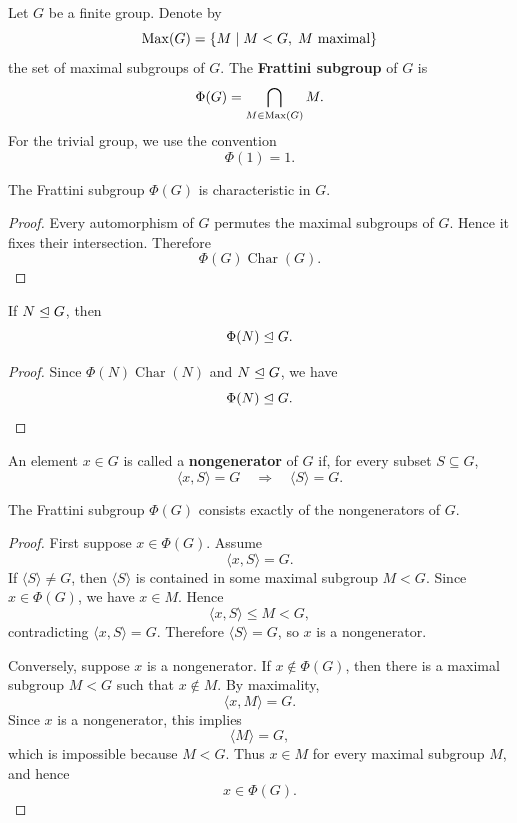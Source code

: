 \begin{definition}
Let \(G\) be a finite group. Denote by
\[
    \operatorname{Max}(G)=\{M\mid M<G,\; M\text{ maximal}\}
\]
the set of maximal subgroups of \(G\). The \textbf{Frattini subgroup} of \(G\) is
\[
    \Phi(G)=\bigcap_{M\in \operatorname{Max}(G)}M.
\]
For the trivial group, we use the convention
\[
    \Phi(1)=1.
\]
\end{definition}

\begin{proposition}
The Frattini subgroup \(\Phi(G)\) is characteristic in \(G\).
\end{proposition}

\begin{proof}
Every automorphism of \(G\) permutes the maximal subgroups of \(G\). Hence it
fixes their intersection. Therefore
\[
    \Phi(G)  \operatorname{Char}(G).
\]
\end{proof}

\begin{corollary}
If \(N\trianglelefteq G\), then
\[
    \Phi(N)\trianglelefteq G.
\]
\end{corollary}

\begin{proof}
Since \(\Phi(N)  \operatorname{Char}(N)\) and \(N\trianglelefteq G\), we have
\[
    \Phi(N)\trianglelefteq G.
\]
\end{proof}

\begin{definition}[Nongenerator]
An element \(x\in G\) is called a \textbf{nongenerator} of \(G\) if, for every
subset \(S\subseteq G\),
\[
    \langle x,S\rangle=G
    \quad\Longrightarrow\quad
    \langle S\rangle=G.
\]
\end{definition}

\begin{lemma}
The Frattini subgroup \(\Phi(G)\) consists exactly of the nongenerators of \(G\).
\end{lemma}

\begin{proof}
First suppose \(x\in \Phi(G)\). Assume
\[
    \langle x,S\rangle=G.
\]
If \(\langle S\rangle\neq G\), then \(\langle S\rangle\) is contained in some
maximal subgroup \(M<G\). Since \(x\in \Phi(G)\), we have \(x\in M\). Hence
\[
    \langle x,S\rangle\leq M<G,
\]
contradicting \(\langle x,S\rangle=G\). Therefore \(\langle S\rangle=G\), so
\(x\) is a nongenerator.

Conversely, suppose \(x\) is a nongenerator. If \(x\notin \Phi(G)\), then
there is a maximal subgroup \(M<G\) such that \(x\notin M\). By maximality,
\[
    \langle x,M\rangle=G.
\]
Since \(x\) is a nongenerator, this implies
\[
    \langle M\rangle=G,
\]
which is impossible because \(M<G\). Thus \(x\in M\) for every maximal
subgroup \(M\), and hence
\[
    x\in \Phi(G).
\]
\end{proof}

